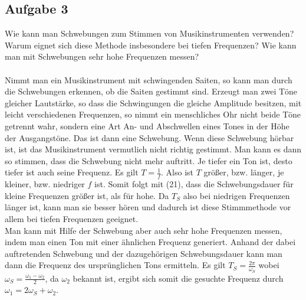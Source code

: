 \documentclass[a4paper,10pt]{scrartcl}
\begin{document}
		\subsection{Aufgabe 3}
			Wie kann man Schwebungen zum Stimmen von Musikinstrumenten verwenden? Warum eignet
			sich diese Methode insbesondere bei tiefen Frequenzen? Wie kann man mit Schwebungen sehr
			hohe Frequenzen messen?\\
			\\
			Nimmt man ein Musikinstrument mit schwingenden Saiten, so kann man durch die Schwebungen erkennen, ob die Saiten gestimmt sind. Erzeugt man zwei Töne gleicher Lautstärke, so dass die Schwingungen die gleiche Amplitude besitzen, mit leicht verschiedenen Frequenzen, so nimmt ein menschliches Ohr nicht beide Töne getrennt wahr, sondern eine Art An- und Abschwellen eines Tones in der Höhe der Ausgangstöne. Das ist dann eine Schwebung. Wenn diese Schwebung hörbar ist, ist das Musikinstrument vermutlich nicht richtig gestimmt. Man kann es dann so stimmen, dass die Schwebung nicht mehr auftritt. Je tiefer ein Ton ist, desto tiefer ist auch seine Frequenz. Es gilt \(T=\frac{1}{f}\). Also ist \(T\) größer, bzw. länger, je kleiner, bzw. niedriger \(f\) ist. Somit folgt mit (21), dass die Schwebungsdauer für kleine Frequenzen größer ist, als für hohe. Da \(T_{S}\) also bei niedrigen Frequenzen länger ist, kann man sie besser hören und dadurch ist diese Stimmmethode vor allem bei tiefen Frequenzen geeignet.\\
			Man kann mit Hilfe der Schwebung aber auch sehr hohe Frequenzen messen, indem man einen Ton mit einer ähnlichen Frequenz generiert. Anhand der dabei auftretenden Schwebung und der dazugehörigen Schwebungsdauer kann man dann die Frequenz des ursprünglichen Tons ermitteln. Es  gilt \(T_{S}=\frac{2\pi}{\omega_{S}}\) wobei \(\omega_{S}=\frac{\omega_{1}-\omega_{2}}{2}\), da \(\omega_{2}\) bekannt ist, ergibt sich somit die gesuchte Frequenz durch \(\omega_{1}=2\omega_{S}+\omega_{2}\). 
			
\end{document}
